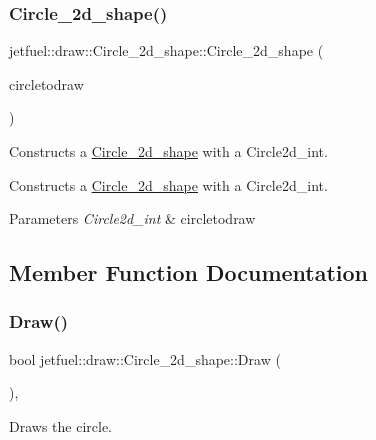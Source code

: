 \subsubsection{\texorpdfstring{Circle\+\_\+2d\+\_\+shape()}{Circle\_2d\_shape()}\hspace{0.1cm}{\footnotesize\ttfamily [2/2]}}
{\footnotesize\ttfamily jetfuel\+::draw\+::\+Circle\+\_\+2d\+\_\+shape\+::\+Circle\+\_\+2d\+\_\+shape (\begin{DoxyParamCaption}\item[{const \hyperlink{classjetfuel_1_1draw_1_1Circle2d}{Circle2d\+\_\+int}}]{circletodraw }\end{DoxyParamCaption})}



Constructs a \hyperlink{classjetfuel_1_1draw_1_1Circle__2d__shape}{Circle\+\_\+2d\+\_\+shape} with a Circle2d\+\_\+int. 

Constructs a \hyperlink{classjetfuel_1_1draw_1_1Circle__2d__shape}{Circle\+\_\+2d\+\_\+shape} with a Circle2d\+\_\+int.


\begin{DoxyParams}{Parameters}
{\em Circle2d\+\_\+int} & circletodraw \\
\hline
\end{DoxyParams}


\subsection{Member Function Documentation}
\mbox{\label{classjetfuel_1_1draw_1_1Circle__2d__shape_a8be660f3cd624dc077d9003ee3b37212}} 
\subsubsection{\texorpdfstring{Draw()}{Draw()}}
{\footnotesize\ttfamily bool jetfuel\+::draw\+::\+Circle\+\_\+2d\+\_\+shape\+::\+Draw (\begin{DoxyParamCaption}{ }\end{DoxyParamCaption})\hspace{0.3cm}{\ttfamily [override]}, {\ttfamily [virtual]}}



Draws the circle. 

